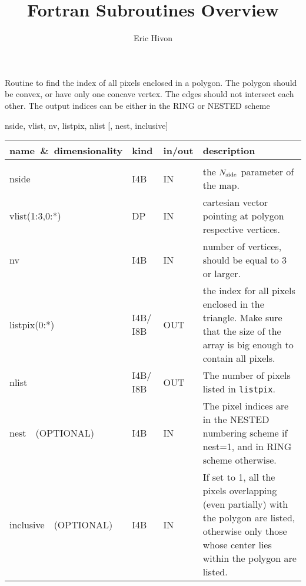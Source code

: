 
\sloppy


\title{\healpix Fortran Subroutines Overview}
 \section[query\_polygon]{ }
\label{sub:query_polygon}
\author{Eric Hivon}

\begin{facility}
{Routine to find the index of all pixels enclosed in a polygon. The polygon should be convex, 
or have only one concave vertex. The edges should not intersect each other. 
The output indices can be either in the RING or NESTED scheme} 
{\modPixTools}
\end{facility}

\begin{f90format}
{nside, vlist, nv, listpix, nlist [, nest, inclusive]}
\end{f90format}

\begin{arguments}
{
\begin{tabular}{p{0.25\hsize} p{0.05\hsize} p{0.1\hsize} p{0.5\hsize}} \hline  
\textbf{name~\&~dimensionality} & \textbf{kind} & \textbf{in/out} & \textbf{description} \\ \hline
                   &   &   &                           \\ %
nside & I4B & IN & the ${N_{\rm side}}$ parameter of the map. \\
vlist(1:3,0:*) & DP & IN & cartesian vector pointing at polygon
                   respective vertices. \\
nv & I4B & IN & number of vertices, should be equal to 3 or larger. \\
listpix(0:*) & I4B/ I8B & OUT & the index for all pixels enclosed in the triangle. Make sure that the size of the array is big enough to contain all pixels. \\ 
nlist & I4B/ I8B & OUT & The number of pixels listed in {\tt listpix}. \\
nest\ \ (OPTIONAL) & I4B & IN &  The pixel indices are in the NESTED numbering scheme if nest=1, and in RING scheme otherwise. \\
inclusive\ \ (OPTIONAL) & I4B & IN & If set to 1, all the pixels overlapping
                   (even partially)
                   with the polygon are listed, otherwise only those whose
                   center lies within the polygon are listed. \\
\end{tabular}
}
\end{arguments}

